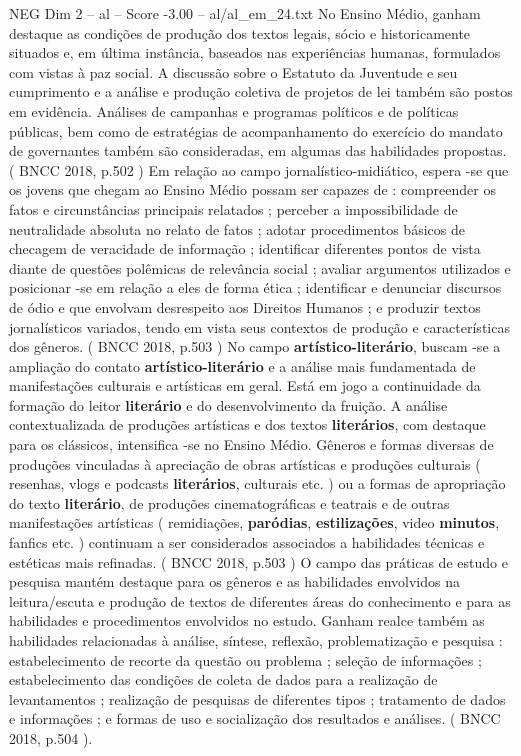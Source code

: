 \begin{textsample}{NEG Dim 2 – al – Score -3.00 – al/al\_em\_24.txt}
No Ensino Médio, ganham destaque as condições de produção dos textos legais, sócio e historicamente situados e, em última instância, baseados nas experiências humanas, formulados com vistas à paz social.
A discussão sobre o Estatuto da Juventude e seu cumprimento e a análise e produção coletiva de projetos de lei também são postos em evidência.
Análises de campanhas e programas políticos e de políticas públicas, bem como de estratégias de acompanhamento do exercício do mandato de governantes também são consideradas, em algumas das habilidades propostas. ( BNCC 2018, p.502 ) Em relação ao campo jornalístico-midiático, espera -se que os jovens que chegam ao Ensino Médio possam ser capazes de : compreender os fatos e circunstâncias principais relatados ; perceber a impossibilidade de neutralidade absoluta no relato de fatos ; adotar procedimentos básicos de checagem de veracidade de informação ; identificar diferentes pontos de vista diante de questões polêmicas de relevância social ; avaliar argumentos utilizados e posicionar -se em relação a eles de forma ética ; identificar e denunciar discursos de ódio e que envolvam desrespeito aos Direitos Humanos ; e produzir textos jornalísticos variados, tendo em vista seus contextos de produção e características dos gêneros. ( BNCC 2018, p.503 ) No campo \textbf{artístico-literário}, buscam -se a ampliação do contato \textbf{artístico-literário} e a análise mais fundamentada de manifestações culturais e artísticas em geral.
Está em jogo a continuidade da formação do leitor \textbf{literário} e do desenvolvimento da fruição.
A análise contextualizada de produções artísticas e dos textos \textbf{literários}, com destaque para os clássicos, intensifica -se no Ensino Médio.
Gêneros e formas diversas de produções vinculadas à apreciação de obras artísticas e produções culturais ( resenhas, vlogs e podcasts \textbf{literários}, culturais etc. ) ou a formas de apropriação do texto \textbf{literário}, de produções cinematográficas e teatrais e de outras manifestações artísticas ( remidiações, \textbf{paródias}, \textbf{estilizações}, video \textbf{minutos}, fanfics etc. ) continuam a ser considerados associados a habilidades técnicas e estéticas mais refinadas. ( BNCC 2018, p.503 ) O campo das práticas de estudo e pesquisa mantém destaque para os gêneros e as habilidades envolvidos na leitura/escuta e produção de textos de diferentes áreas do conhecimento e para as habilidades e procedimentos envolvidos no estudo.
Ganham realce também as habilidades relacionadas à análise, síntese, reflexão, problematização e pesquisa : estabelecimento de recorte da questão ou problema ; seleção de informações ; estabelecimento das condições de coleta de dados para a realização de levantamentos ; realização de pesquisas de diferentes tipos ; tratamento de dados e informações ; e formas de uso e socialização dos resultados e análises. ( BNCC 2018, p.504 ).

\end{textsample}
